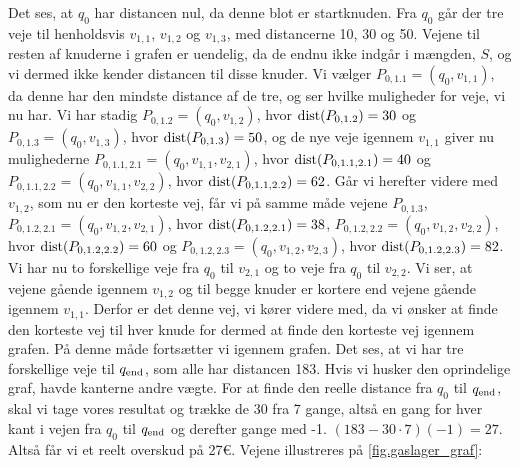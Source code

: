  


Det ses, at $q_0$ har distancen nul, da denne blot er startknuden. Fra $q_0$ går der tre veje til henholdsvis $v_{1,1}$, $v_{1,2}$ og $v_{1,3}$, med distancerne 10, 30 og 50. Vejene til resten af knuderne i grafen er uendelig, da de endnu ikke indgår i mængden, $S$, og vi dermed ikke kender distancen til disse knuder. Vi vælger $P_{0,1.1}=(q_0, v_{1,1})$, da denne har den mindste distance af de tre, og ser hvilke muligheder for veje, vi nu har. Vi har stadig $P_{0,1.2}=(q_{0},v_{1,2})$, hvor $\textrm{dist}(P_{0,1.2})=30$ og $P_{0,1.3}=(q_{0},v_{1,3})$, hvor $\textrm{dist}(P_{0,1.3})=50$, og de nye veje igennem $v_{1,1}$ giver nu mulighederne $P_{0,1.1,2.1}=(q_{0},v_{1,1},v_{2,1})$, hvor $\textrm{dist}(P_{0,1.1,2.1})=40$ og $P_{0,1.1,2.2}=(q_{0},v_{1,1},v_{2,2})$, hvor $\textrm{dist}(P_{0,1.1,2.2})=62$. Går vi herefter videre med $v_{1,2}$, som nu er den korteste vej, får vi på samme måde vejene $P_{0,1.3}$, $P_{0,1.2,2.1}=(q_{0},v_{1,2},v_{2,1})$, hvor $\textrm{dist}(P_{0,1.2,2.1})=38$, $P_{0,1.2,2.2}=(q_{0},v_{1,2},v_{2,2})$, hvor $\textrm{dist}(P_{0,1.2,2.2})=60$ og $P_{0,1.2,2.3}=(q_{0},v_{1,2},v_{2,3})$, hvor $\textrm{dist}(P_{0,1.2,2.3})=82$. Vi har nu to forskellige veje fra $q_{0}$ til $v_{2,1}$ og to veje fra $q_{0}$ til $v_{2,2}$. Vi ser, at vejene gående igennem $v_{1,2}$ og til begge knuder er kortere end vejene gående igennem $v_{1,1}$. Derfor er det denne vej, vi kører videre med, da vi ønsker at finde den korteste vej til hver knude for dermed at finde den korteste vej igennem grafen. På denne måde fortsætter vi igennem grafen. Det ses, at vi har tre forskellige veje til $q_{\textrm{end}}$, som alle har distancen 183. Hvis vi husker den oprindelige graf, havde kanterne andre vægte. For at finde den reelle distance fra $q_{0}$ til $q_{\textrm{end}}$, skal vi tage vores resultat og trække de 30 fra 7 gange, altså en gang for hver kant i vejen fra $q_{0}$ til $q_{\textrm{end}}$ og derefter gange med -1.
$(183-30 \cdot 7) (-1) = 27$. Altså får vi et reelt overskud på 27€.
Vejene illustreres på \autoref{fig.gaslager_graf}:





